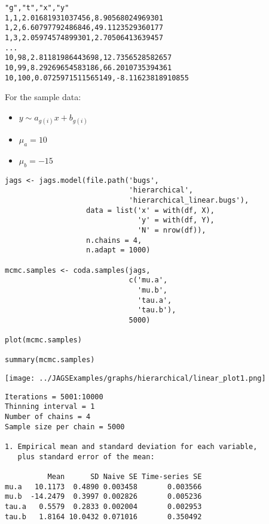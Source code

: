 \documentclass{beamer}
\begin{document}
\begin{frame}[fragile]
  \begin{verbatim}
"g","t","x","y"
1,1,2.01681931037456,8.90568024969301
1,2,6.60797792486846,49.1123529360177
1,3,2.05974574899301,2.70506413639457
...
10,98,2.81181986443698,12.7356528582657
10,99,8.29269654583186,66.2010735394361
10,100,0.0725971511565149,-8.11623818910855
  \end{verbatim}
\end{frame}

\begin{frame}
  For the sample data:
  \begin{itemize}
    \item{$y \sim a_{g(i)} x + b_{g(i)}$}
    \item{$\mu_a = 10$}
    \item{$\mu_b = -15$}
  \end{itemize}
\end{frame}

\begin{frame}[fragile]
  \begin{verbatim}
jags <- jags.model(file.path('bugs',
                             'hierarchical',
                             'hierarchical_linear.bugs'),
                   data = list('x' = with(df, X),
                               'y' = with(df, Y),
                               'N' = nrow(df)),
                   n.chains = 4,
                   n.adapt = 1000)
 
mcmc.samples <- coda.samples(jags,
                             c('mu.a',
                               'mu.b',
                               'tau.a',
                               'tau.b'),
                             5000)

plot(mcmc.samples)

summary(mcmc.samples)
  \end{verbatim}
\end{frame}

\begin{frame}[fragile]
  \begin{center}
    \texttt{[image: ../JAGSExamples/graphs/hierarchical/linear\_plot1.png]}
  \end{center}
\end{frame}

\begin{frame}[fragile]
  \begin{verbatim}
Iterations = 5001:10000
Thinning interval = 1 
Number of chains = 4 
Sample size per chain = 5000 

1. Empirical mean and standard deviation for each variable,
   plus standard error of the mean:

          Mean      SD Naive SE Time-series SE
mu.a   10.1173  0.4890 0.003458       0.003566
mu.b  -14.2479  0.3997 0.002826       0.005236
tau.a   0.5579  0.2833 0.002004       0.002953
tau.b   1.8164 10.0432 0.071016       0.350492
  \end{verbatim}
\end{frame}
\end{document}
